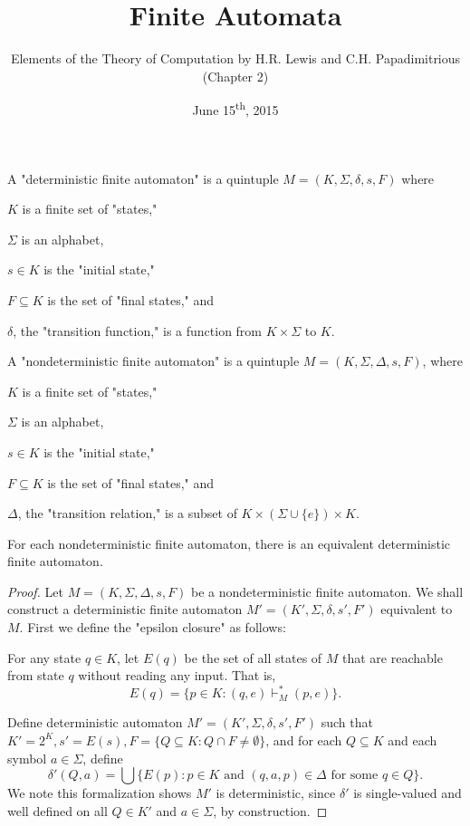 \documentclass[a4paper,8pt]{article}
\title{Finite Automata}
\author{Elements of the Theory of Computation by H.R. Lewis and C.H. Papadimitrious (Chapter 2)}
\date{June 15\textsuperscript{th}, 2015}
\begin{document}
\maketitle
{}

\begin{outline}

    A "deterministic finite automaton" is a quintuple \(M=(K,\Sigma,\delta,s,F)\) where

    \quad\(K\) is a finite set of "states,"

    \quad\(\Sigma\) is an alphabet,

    \quad\(s \in K\) is the "initial state,"

    \quad\(F \subseteq K\) is the set of "final states," and

    \quad\(\delta\), the "transition function," is a function from \(K \times \Sigma\) to \(K\).

    A "nondeterministic finite automaton" is a quintuple \(M = (K, \Sigma, \Delta, s, F)\), where

    \quad\(K\) is a finite set of "states,"

    \quad\(\Sigma\) is an alphabet,

    \quad\(s \in K\) is the "initial state,"

    \quad\(F \subseteq K\) is the set of "final states," and

    \quad\(\Delta\), the "transition relation," is a subset of \(K\times(\Sigma\cup\{e\})\times K\).

    For each nondeterministic finite automaton, there is an equivalent deterministic finite automaton.

    \begin{proof}
      Let \(M=(K,\Sigma,\Delta,s,F)\) be a nondeterministic finite automaton. We shall construct a deterministic
      finite automaton \(M'=(K',\Sigma,\delta,s',F')\) equivalent to \(M\). First we define the "epsilon closure" as follows:

      For any state \(q \in K\), let \(E(q)\) be the set of all states of \(M\) that are reachable from state \(q\) without
      reading any input. That is, \[ E(q) = \{p\in K: (q,e) \vdash_M^* (p, e)\}\text{.} \]

      Define deterministic automaton \(M'=(K',\Sigma,\delta,s',F')\) such that \(K'=2^K, s'=E(s),F=\{Q \subseteq K: Q \cap F \neq \emptyset\}\),
      and for each \(Q \subseteq K\) and each symbol \(a \in \Sigma\), define
      \[ \delta'(Q, a) = \bigcup\{E(p): p \in K \text{ and } (q,a,p) \in \Delta \text{ for some } q \in Q\}\text{.} \]
      We note this formalization shows \(M'\) is deterministic, since \(\delta'\) is single-valued and well defined on all \(Q \in K'\)
      and \(a \in \Sigma\), by construction.


\end{proof}
\end{outline}
\end{document}
